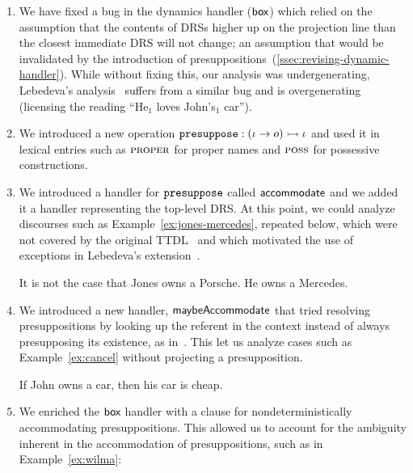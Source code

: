 \begin{enumerate}
\item \label{item:fixbug} We have fixed a bug in the dynamics handler
  ($\textsf{box}$) which relied on the assumption that the contents of DRSs higher
  up on the projection line than the closest immediate DRS will not change;
  an assumption that would be invalidated by the introduction of
  presuppositions~(\ref{ssec:revising-dynamic-handler}). While without
  fixing this, our analysis was undergenerating, Lebedeva's
  analysis~\cite{lebedeva2012expression} suffers from a similar bug and is
  overgenerating (licensing the reading ``He$_1$ loves John's$_1$ car'').
  
\item \label{item:presuppose-op} We introduced a new operation
  $\mathtt{presuppose} : (\iota \to o) \rightarrowtail \iota$ and used it in lexical
  entries such as $\textsc{proper}$ for proper names and $\textsc{poss}$ for
  possessive constructions.

\item \label{item:accommodate-handler} We introduced a handler for
  $\mathtt{presuppose}$ called $\textsf{accommodate}$ and we added it a handler
  representing the top-level DRS. At this point, we could analyze
  discourses such as Example~\ref{ex:jones-mercedes}, repeated below, which
  were not covered by the original TTDL~\cite{de2006towards} and which
  motivated the use of exceptions in Lebedeva's
  extension~\cite{lebedeva2012expression}.

  \begin{exe}
     It is not the case that Jones owns a
    Porsche. He owns a Mercedes.
  \end{exe}

\item \label{item:maybe-accommodate} We introduced a new handler,
  $\textsf{maybeAccommodate}$ that tried resolving presuppositions by looking up
  the referent in the context instead of always presupposing its existence,
  as in~\cite{lebedeva2012expression}. This let us analyze cases such as
  Example~\ref{ex:cancel} without projecting a presupposition.

  \begin{exe}
     If John owns a car, then his car is cheap.
  \end{exe}

\item \label{item:nondet-accommodation} We enriched the $\textsf{box}$ handler with
  a clause for nondeterministically accommodating presuppositions. This
  allowed us to account for the ambiguity inherent in the accommodation of
  presuppositions, such as in Example~\ref{ex:wilma}:


\end{enumerate}
